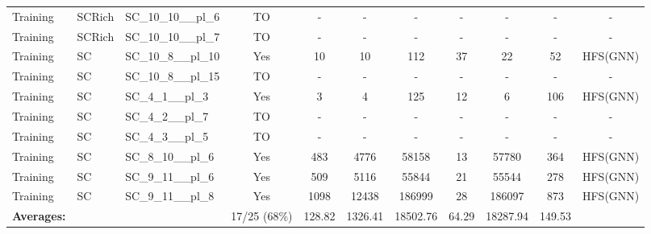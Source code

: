 \documentclass{article}
\begin{document}
\begin{tabular}{lllcccccccc}
Training & SCRich & SC\_10\_10\_\_pl\_6 & TO & - & - & - & - & - & - & - \\
Training & SCRich & SC\_10\_10\_\_pl\_7 & TO & - & - & - & - & - & - & - \\
Training & SC & SC\_10\_8\_\_pl\_10 & Yes & 10 & 10 & 112 & 37 & 22 & 52 & HFS(GNN) \\
Training & SC & SC\_10\_8\_\_pl\_15 & TO & - & - & - & - & - & - & - \\
Training & SC & SC\_4\_1\_\_pl\_3 & Yes & 3 & 4 & 125 & 12 & 6 & 106 & HFS(GNN) \\
Training & SC & SC\_4\_2\_\_pl\_7 & TO & - & - & - & - & - & - & - \\
Training & SC & SC\_4\_3\_\_pl\_5 & TO & - & - & - & - & - & - & - \\
Training & SC & SC\_8\_10\_\_pl\_6 & Yes & 483 & 4776 & 58158 & 13 & 57780 & 364 & HFS(GNN) \\
Training & SC & SC\_9\_11\_\_pl\_6 & Yes & 509 & 5116 & 55844 & 21 & 55544 & 278 & HFS(GNN) \\
Training & SC & SC\_9\_11\_\_pl\_8 & Yes & 1098 & 12438 & 186999 & 28 & 186097 & 873 & HFS(GNN) \\
\textbf{Averages:} & & & 17/25 (68\%) & 128.82 & 1326.41 & 18502.76 & 64.29 & 18287.94 & 149.53 & \\
\bottomrule
\end{tabular}
\newpage
\end{document}
